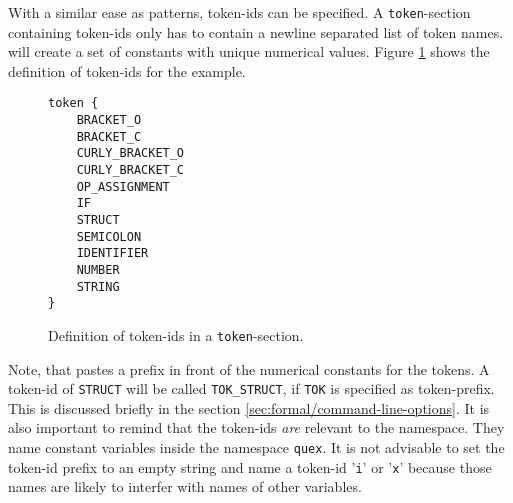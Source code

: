 With a similar ease as patterns, token-ids can be specified. A {\tt token}-section  containing
token-ids only has to contain a newline separated list of token names.
{\Quex} will create a set of constants with unique numerical values. Figure
\ref{fig:token-ids-code} shows the definition of token-ids for the example.

\begin{figure}
\begin{lstlisting}
token {
    BRACKET_O
    BRACKET_C
    CURLY_BRACKET_O
    CURLY_BRACKET_C
    OP_ASSIGNMENT
    IF
    STRUCT
    SEMICOLON
    IDENTIFIER
    NUMBER
    STRING
}
\end{lstlisting}
\label{fig:token-ids-code}
\caption{Definition of token-ids in a {\tt token}-section.}
\end{figure}

Note, that {\quex} pastes a prefix in front of the numerical constants for the tokens.
A token-id of {\tt STRUCT} will be called {\tt TOK\_STRUCT}, if {\tt TOK} is
specified as token-prefix. This is discussed briefly in the section
\ref{sec:formal/command-line-options}. It is also important to remind that
the token-ids {\it are} relevant to the namespace. They name constant variables
inside the namespace {\tt quex}. It is not advisable to set the token-id prefix
to an empty string and name a token-id '{\tt i}' or '{\tt x}' because those 
names are likely to interfer with names of other variables.

